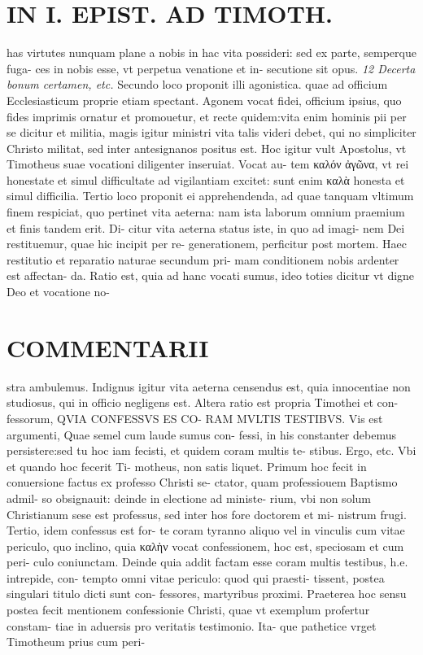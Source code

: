 \documentclass{article}
\begin{document}
\begin{pages}
\section*{IN I. EPIST. AD TIMOTH. }
\marginpar{[ p.161 ]}\pstart has virtutes nunquam plane a nobis in hac vita possideri: sed ex parte, semperque fuga- ces in nobis esse, vt perpetua venatione et in- secutione sit opus.  \pend
\textit{12 Decerta bonum certamen, etc. }\pstart Secundo loco proponit illi agonistica. quae ad officium Ecclesiasticum proprie etiam spectant. Agonem vocat fidei, officium ipsius, quo fides imprimis ornatur et promouetur, et recte quidem:vita enim hominis pii per se dicitur et militia, magis igitur ministri vita talis videri debet, qui no simpliciter Christo militat, sed inter antesignanos positus est. Hoc igitur vult Apostolus, vt Timotheus suae vocationi diligenter inseruiat. Vocat au- tem καλόν ἀγῶνα, vt rei honestate et simul difficultate ad vigilantiam excitet: sunt enim καλὰ honesta et simul difficilia.  \pend\pstart Tertio loco proponit ei apprehendenda, ad quae tanquam vltimum finem respiciat, quo pertinet vita aeterna: nam ista laborum omnium praemium et finis tandem erit. Di- citur vita aeterna status iste, in quo ad imagi- nem Dei restituemur, quae hic incipit per re- generationem, perficitur post mortem. Haec restitutio et reparatio naturae secundum pri- mam conditionem nobis ardenter est affectan- da. Ratio est, quia ad hanc vocati sumus, ideo toties dicitur vt digne Deo et vocatione no-  \pend
\marginpar{[ p.162 ]}
\section*{COMMENTARII }\pstart stra ambulemus. Indignus igitur vita aeterna censendus est, quia innocentiae non studiosus, qui in officio negligens est.  \pend\pstart Altera ratio est propria Timothei et con- fessorum, QVIA CONFESSVS ES CO- RAM MVLTIS TESTIBVS. Vis est argumenti, Quae semel cum laude sumus con- fessi, in his constanter debemus persistere:sed tu hoc iam fecisti, et quidem coram multis te- stibus. Ergo, etc. Vbi et quando hoc fecerit Ti- motheus, non satis liquet. Primum hoc fecit in conuersione factus ex professo Christi se- ctator, quam professiouem Baptismo admil- so obsignauit: deinde in electione ad ministe- rium, vbi non solum Christianum sese est professus, sed inter hos fore doctorem et mi- nistrum frugi. Tertio, idem confessus est for- te coram tyranno aliquo vel in vinculis cum vitae periculo, quo inclino, quia καλὴν vocat confessionem, hoc est, speciosam et cum peri- culo coniunctam. Deinde quia addit factam esse coram multis testibus, h.e. intrepide, con- tempto omni vitae periculo: quod qui praesti- tissent, postea singulari titulo dicti sunt con- fessores, martyribus proximi. Praeterea hoc sensu postea fecit mentionem confessionie Christi, quae vt exemplum profertur constam- tiae in aduersis pro veritatis testimonio. Ita- que pathetice vrget Timotheum prius cum peri-  \pend

\end{pages}
\end{document}

